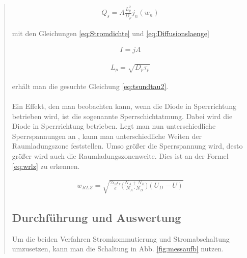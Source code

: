 \begin{quote}
	\begin{equation}
         \begin{split}
             Q_{s}=A\frac{L_{p}^{2}}{D_p}j_{n}(w_n)
             \end{split}
         \label{eq:blalbl}
    \end{equation}

	mit den Gleichungen \ref{eq:Stromdichte} und \ref{eq:Diffusionslaenge}

	\begin{equation}
         \begin{split}
             I=jA
             \end{split}
         \label{eq:Stromdichte}
    \end{equation}

    \begin{equation}
         \begin{split}
             L_{p}=\sqrt{D_{p}\tau_{p}}
             \end{split}
         \label{eq:Diffusionslaenge}
    \end{equation}

    erhält man die gesuchte Gleichung \ref{eq:tsundtau2}.\\
   	\\
    Ein Effekt, den man beobachten kann, wenn die Diode in Sperrrichtung
    betrieben wird, ist die sogenannte Sperrschichtatmung. Dabei wird die Diode
    in Sperrrichtung betrieben. Legt man nun unterschiedliche Sperrspannungen an
    , kann man unterschiedliche Weiten der Raumladungszone feststellen. Umso
    größer die Sperrspannung wird, desto größer wird auch die
    Raumladungszonenweite. Dies ist an der Formel \ref{eq:wrlz} zu erkennen.

     \begin{equation}
         \begin{split}
             w_{RLZ}=\sqrt{\frac{2\epsilon_{0}\epsilon_{r}}{e}\bigg(\frac{N_{A}+N_{B}}{N_{A}\cdot N_{B}}\bigg)(U_{D}-U)}
             \end{split}
         \label{eq:wrlz}
    \end{equation}

  \subsection{Durchführung und Auswertung}

     Um die beiden Verfahren Stromkommutierung und Stromabschaltung umzusetzen,
     kann man die Schaltung in Abb. \ref{fig:messaufb} nutzen.


\end{quote}
